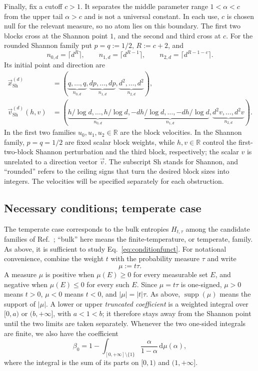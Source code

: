 \documentclass[aps,pra,11pt,onecolumn,nofootinbib,tightenlines]{revtex4-2}
\theoremstyle{definition}
\newcommand{\R}{\mathbb{R}}
\def\d{\mathrm{d}}
\newcommand{\ParameterMainForms}{the candidate families of Ref.~\cite{rubboli2026complete}}
\begin{document}
Finally, fix a cutoff $c>1$.  It separates the middle parameter range
$1<\alpha<c$ from the upper tail $\alpha>c$ and is not a universal constant.
In each use, $c$ is chosen null for the relevant measure, so no atom
lies on this boundary.  The first two blocks cross at the Shannon point $1$,
and the second and third cross at $c$.  For the rounded Shannon family put
$p=q:=1/2$, $R:=c+2$, and
\begin{equation}
n_{0,d}=\lceil d^R\rceil,
\qquad
n_{1,d}=\lceil d^{R-1}\rceil,
\qquad
n_{2,d}=\lceil d^{R-1-c}\rceil.
\end{equation}
Its initial point and direction are
\begin{align}
\vec{x}_{\mathrm{Sh}}^{(d)}
&=\left(
\underbrace{q,\ldots,q}_{n_{0,d}},
\underbrace{dp,\ldots,dp}_{n_{1,d}},
\underbrace{d^2,\ldots,d^2}_{n_{2,d}}
\right),
\label{eq:concise-Shannon-point}\\
\vec{v}_{\mathrm{Sh}}^{(d)}(h,v)
&=\left(
\underbrace{h/\log d,\ldots,h/\log d}_{n_{0,d}},
\underbrace{-dh/\log d,\ldots,-dh/\log d}_{n_{1,d}},
\underbrace{d^2v,\ldots,d^2v}_{n_{2,d}}
\right).
\label{eq:concise-Shannon-direction}
\end{align}
In the first two families $u_0,u_1,u_2\in\R$ are the block velocities.  In
the Shannon family, $p=q=1/2$ are fixed scalar block weights, while
$h,v\in\R$ control the first-two-block Shannon perturbation and the third
block, respectively; the scalar $v$ is unrelated to a direction vector
$\vec{v}$.  The subscript $\mathrm{Sh}$ stands for Shannon, and ``rounded''
refers to the ceiling signs that turn the desired block sizes into integers.
The velocities will be specified separately for each obstruction.

\subsection{Necessary conditions; temperate case}

The temperate case corresponds to the bulk entropies $H_{t,\tau}$ among
\ParameterMainForms; ``bulk'' here means the finite-temperature, or temperate,
family.  As above, it is sufficient to study
Eq.~\eqref{eq:conditionfunct}.  For notational convenience, combine the weight
$t$ with the probability measure $\tau$ and write
\begin{equation}
\mu:=t\tau.
\end{equation}
A measure $\mu$ is positive when $\mu(E)\geq0$ for every measurable set $E$,
and negative when $\mu(E)\leq0$ for every such $E$.  Since $\mu=t\tau$ is
one-signed, $\mu>0$ means $t>0$, $\mu<0$ means $t<0$, and
$|\mu|=|t|\tau$.  As above, $\operatorname{supp}(\mu)$ means the support of
$|\mu|$.  A lower or upper \emph{truncated coefficient} is a weighted integral
over $[0,a)$ or $(b,+\infty]$, with $a<1<b$; it therefore stays away from the
Shannon point until the two limits are taken separately.
Whenever the two one-sided integrals are finite, we also have the coefficient
\begin{equation}
\label{eq:definition-beta0}
\beta_0=1-
\int_{[0,+\infty]\setminus\{1\}}
\frac{\alpha}{1-\alpha}\,\d\mu(\alpha),
\end{equation}
where the integral is the sum of its parts on $[0,1)$ and $(1,+\infty]$.
\end{document}
